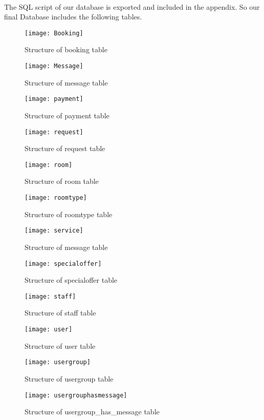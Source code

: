       \paragraph{}
        The SQL script of our database is exported and included in the appendix.
        So our final Database includes the following tables.\\
        \newpage
    \begin{center}
      \begin{figure}
        \texttt{[image: Booking]}
        \caption{Structure of booking table}
      \end{figure}
      \begin{figure}
        \texttt{[image: Message]}
        \caption{Structure of message table}
      \end{figure}
      \begin{figure}
        \texttt{[image: payment]}
        \caption{Structure of payment table}
      \end{figure}
      \begin{figure}
        \texttt{[image: request]}
        \caption{Structure of request table}
      \end{figure}
      \begin{figure}
        \texttt{[image: room]}
        \caption{Structure of room table}
      \end{figure}
      \begin{figure}
        \texttt{[image: roomtype]}
        \caption{Structure of roomtype table}
      \end{figure}
      \begin{figure}
        \texttt{[image: service]}
        \caption{Structure of message table}
      \end{figure}
      \begin{figure}
        \texttt{[image: specialoffer]}
        \caption{Structure of specialoffer table}
      \end{figure}
      \begin{figure}
        \texttt{[image: staff]}
        \caption{Structure of staff table}
      \end{figure}
      \begin{figure}
        \texttt{[image: user]}
        \caption{Structure of user table}
      \end{figure}
      \begin{figure}
        \texttt{[image: usergroup]}
        \caption{Structure of usergroup table}
      \end{figure}
      \begin{figure}
        \texttt{[image: usergrouphasmessage]}
        \caption{Structure of usergroup\_has\_message table}
      \end{figure}
    \end{center}
